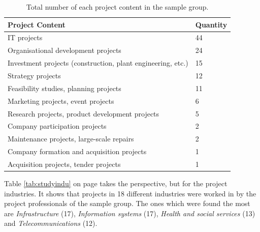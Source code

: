 \begin{table}[!hbt]
\centering
\captionsetup{font=small}
\footnotesize
    \begin{tabular}{|l|l|}
    \hline
    Project Content                                             & Quantity \\ \hline
    IT projects                                                 & 44       \\
    Organisational development projects                         & 24       \\
    Investment projects (construction, plant engineering, etc.) & 15       \\
    Strategy projects                                           & 12       \\
    Feasibility studies, planning projects                      & 11       \\
    Marketing projects, event projects                          & 6        \\
    Research projects, product development projects             & 5        \\
    Company participation projects                              & 2        \\
    Maintenance projects, large-scale repairs                   & 2        \\
    Company formation and acquisition projects                  & 1        \\
    Acquisition projects, tender projects                       & 1       \\ \hline
    \end{tabular}
    \caption[Total number of each project content in sample group]{Total number of each project content in the sample group.}
    \label{tab:studycont}
\end{table}


Table \ref{tab:studyindu} on page \pageref{tab:studyindu} takes the perspective, but for the project industries. It shows that projects in 18 different industries were worked in by the project professionals of the sample group. The ones which were found the most are \textit{Infrastructure} (17), \textit{Information systems} (17), \textit{Health and social services} (13) and \textit{Telecommunications} (12).\\

